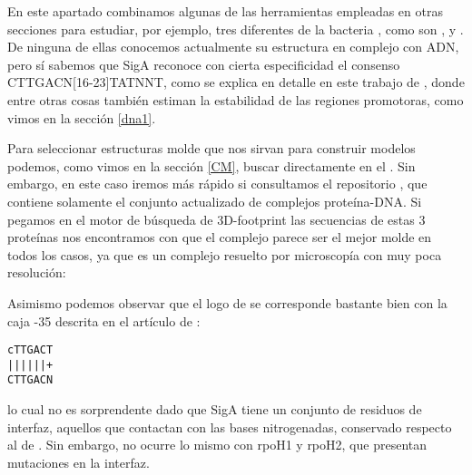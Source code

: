 En este apartado combinamos algunas de las herramientas empleadas en otras secciones para estudiar, por ejemplo, tres diferentes 
de la bacteria , 
como son ,
 y
.
De ninguna de ellas conocemos actualmente su estructura en complejo con ADN,
pero s\'{i} sabemos que SigA reconoce con cierta especificidad el consenso CTTGACN[16-23]TATNNT, 
como se explica en detalle en este trabajo de \cite{RamirezRomero2006}, 
donde entre otras cosas tambi\'{e}n estiman la estabilidad
de las regiones promotoras, como vimos en la secci\'{o}n \ref{dna1}.

Para seleccionar estructuras molde que nos sirvan para construir modelos podemos,
como vimos en la secci\'{o}n \ref{CM}, buscar directamente en el .
Sin embargo, en este caso iremos m\'{a}s r\'{a}pido si consultamos el repositorio 
 \citep{ContrerasMoreira2010}, 
que contiene solamente el conjunto actualizado de complejos prote\'{i}na-DNA.
Si pegamos en el motor de b\'{u}squeda de 3D-footprint las secuencias de estas 3 prote\'{i}nas
nos encontramos con que el complejo 
parece ser el mejor molde en todos los casos, ya que 
es un complejo resuelto por microscop\'{i}a con muy poca resoluci\'{o}n:



Asimismo podemos observar que el logo de 
se corresponde bastante bien con la caja -35 descrita en el art\'{i}culo de \cite{RamirezRomero2006}:
\begin{center} 
\texttt{cTTGACT}\\
\texttt{||||||+}\\
\texttt{CTTGACN}\\
\end{center} 
lo cual no es sorprendente dado que SigA tiene un conjunto de residuos de interfaz, aquellos que contactan con las bases nitrogenadas,
conservado respecto al de . Sin embargo, no 
ocurre lo mismo con rpoH1 y rpoH2, que presentan mutaciones en la interfaz.

